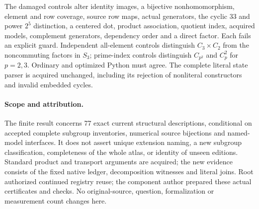 \documentclass[11pt]{article}
\begin{document}
The damaged controls alter identity images, a bijective nonhomomorphism,
element and row coverage, source row maps, actual generators, the cyclic
33 and power $2^5$ distinction, a centered dot, product association,
quotient index, acquired models, complement generators, dependency order
and a direct factor. Each fails an explicit guard. Independent all-element
controls distinguish $C_3\times C_2$ from the noncommuting factors in $S_3$;
prime-index controls distinguish $C_{p^2}$ and $C_p^2$ for $p=2,3$.
Ordinary and optimized Python must agree. The complete literal state
parser is acquired unchanged, including its rejection of nonliteral
constructors and invalid embedded cycles.

\paragraph{Scope and attribution.}
The finite result concerns 77 exact current structural descriptions,
conditional on accepted complete subgroup inventories, numerical source
bijections and named-model interfaces. It does not assert unique
extension naming, a new subgroup classification, completeness of the
whole atlas, or identity of unseen editions. Standard product and
transport arguments are acquired; the new evidence consists of the
fixed native ledger, decomposition witnesses and literal joins.
Root authorized continued registry reuse; the component author prepared
these actual certificates and checks. No original-source, question,
formalization or measurement count changes here.
\end{document}
